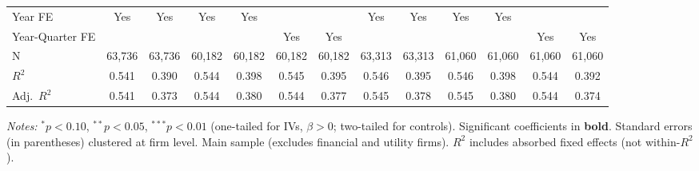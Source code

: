 \begin{landscape}
\begin{table}[H]
\begin{tabular}{lcccccccccccc}
Year FE & Yes & Yes & Yes & Yes &  &  & Yes & Yes & Yes & Yes &  &  \\
Year-Quarter FE &  &  &  &  & Yes & Yes &  &  &  &  & Yes & Yes \\
\midrule
N & 63,736 & 63,736 & 60,182 & 60,182 & 60,182 & 60,182 & 63,313 & 63,313 & 61,060 & 61,060 & 61,060 & 61,060 \\
$R^2$ & 0.541 & 0.390 & 0.544 & 0.398 & 0.545 & 0.395 & 0.546 & 0.395 & 0.546 & 0.398 & 0.544 & 0.392 \\
Adj.~$R^2$ & 0.541 & 0.373 & 0.544 & 0.380 & 0.544 & 0.377 & 0.545 & 0.378 & 0.545 & 0.380 & 0.544 & 0.374 \\
\bottomrule
\end{tabular}
\begin{minipage}{\linewidth}
\vspace{2pt}\scriptsize
\textit{Notes:} $^{*}p<0.10$, $^{**}p<0.05$, $^{***}p<0.01$ (one-tailed for IVs, $\beta > 0$; two-tailed for controls).
 Significant coefficients in \textbf{bold}.
 Standard errors (in parentheses) clustered at firm level.
 Main sample (excludes financial and utility firms).
 $R^2$ includes absorbed fixed effects (not within-$R^2$).
\end{minipage}
\end{table}
\end{landscape}
